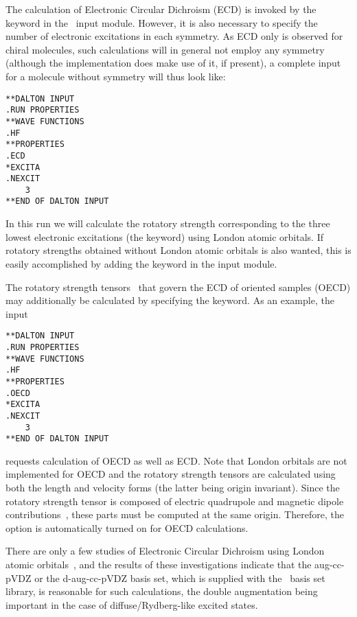 The calculation of Electronic Circular Dichroism
(ECD) is invoked by 
the keyword  in the \aba\ input module. However,
it is also necessary to specify the number of electronic
excitations in 
each symmetry. As ECD only is observed for chiral molecules, such
calculations will in general not employ any symmetry
(although the implementation does make use of it, if present), a complete
input for a molecule without symmetry will thus look like:

\begin{verbatim}
**DALTON INPUT
.RUN PROPERTIES
**WAVE FUNCTIONS
.HF
**PROPERTIES
.ECD
*EXCITA
.NEXCIT
    3
**END OF DALTON INPUT
\end{verbatim}

In this run we will calculate the rotatory strength
corresponding to 
the three lowest electronic excitations
(the  keyword) 
using London atomic orbitals. 
If rotatory strengths obtained without London atomic orbitals is also
wanted, this is easily accomplished by adding the keyword
 in the  input module.

The rotatory strength tensors~\cite{tbpaehcpl246}
that govern the ECD of oriented samples
(OECD) may additionally be
calculated by specifying the  keyword. As an example,
the input

\begin{verbatim}
**DALTON INPUT
.RUN PROPERTIES
**WAVE FUNCTIONS
.HF
**PROPERTIES
.OECD
*EXCITA
.NEXCIT
    3
**END OF DALTON INPUT
\end{verbatim}

requests calculation of OECD as well as ECD.
Note that London orbitals are not implemented for OECD and
the rotatory strength tensors are calculated using both the
length and velocity forms (the latter being origin invariant).
Since the rotatory strength tensor is composed of electric quadrupole
and magnetic dipole contributions~\cite{tbpaehcpl246}, these parts must
be computed at the same origin. Therefore, the 
option is automatically turned on for OECD calculations.

There are only a few studies of Electronic Circular
Dichroism using London atomic
orbitals~\cite{klbaehkrthjopjtca90,mpkrthcpl388}, and the results of
these investigations indicate that the aug-cc-pVDZ or the d-aug-cc-pVDZ
basis set, which is supplied with the \siraba\ basis set library, is 
reasonable for such calculations, the double augmentation being
important in the case of diffuse/Rydberg-like excited states. 

